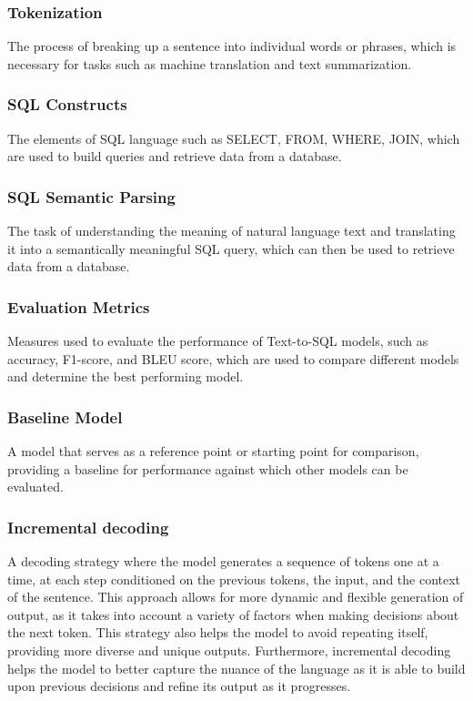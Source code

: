 \subsubsection{Tokenization} The process of breaking up a sentence into individual words or phrases, which is necessary for tasks such as machine translation and text summarization.
\subsubsection{SQL Constructs} The elements of SQL language such as SELECT, FROM, WHERE, JOIN, which are used to build queries and retrieve data from a database.
\subsubsection{SQL Semantic Parsing} The task of understanding the meaning of natural language text and translating it into a semantically meaningful SQL query, which can then be used to retrieve data from a database.
\subsubsection{Evaluation Metrics} Measures used to evaluate the performance of Text-to-SQL models, such as accuracy, F1-score, and BLEU score, which are used to compare different models and determine the best performing model.
\subsubsection{Baseline Model} A model that serves as a reference point or starting point for comparison, providing a baseline for performance against which other models can be evaluated.
\subsubsection{Incremental decoding} A decoding strategy where the model generates a sequence of tokens one at a time, at each step conditioned on the previous tokens, the input, and the context of the sentence. This approach allows for more dynamic and flexible generation of output, as it takes into account a variety of factors when making decisions about the next token. This strategy also helps the model to avoid repeating itself, providing more diverse and unique outputs. Furthermore, incremental decoding helps the model to better capture the nuance of the language as it is able to build upon previous decisions and refine its output as it progresses.
